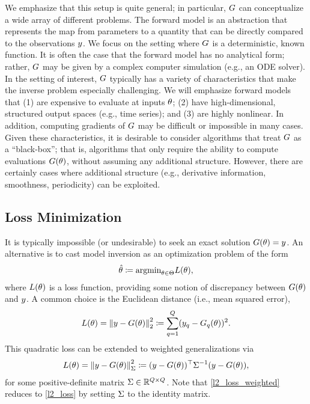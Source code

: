 \documentclass[12pt]{article}
\begin{document}
We emphasize that this setup is quite general; in particular, $G$ can conceptualize a wide array 
of different problems. The forward model is an abstraction that represents the map from parameters to a quantity that
can be directly compared to the observations $y$. We focus on the setting where $G$ is a deterministic, known 
function. It is often the case that the forward model has no analytical form; rather, $G$ may be given by a complex 
computer simulation (e.g., an ODE solver). 
In the setting of interest, $G$ typically has a variety of characteristics that make 
the inverse problem especially challenging. We will emphasize forward models that (1) are expensive to evaluate 
at inputs $\theta$; (2) have high-dimensional, structured output spaces (e.g., time series); and (3) are highly nonlinear. 
In addition, computing gradients of $G$ may be difficult or impossible in many cases. Given these characteristics, 
it is desirable to consider algorithms that treat $G$ as a ``black-box''; that is, algorithms that only require the 
ability to compute evaluations $G(\theta)$, without assuming any additional structure. However, there are certainly 
cases where additional structure (e.g., derivative information, smoothness, periodicity) can be exploited. 

\subsection{Loss Minimization}
It is typically impossible (or undesirable) to seek an exact solution $G(\theta) = y$. An alternative is to cast 
model inversion as an optimization problem of the form 
\begin{align}
\hat{\theta} \coloneqq \text{argmin}_{\theta \in \Theta} L(\theta), \label{opt}
\end{align}
where $L(\theta)$ is a loss function, providing some notion of discrepancy between $G(\theta)$ and $y$.
A common choice is the Euclidean distance (i.e., mean squared error),
\begin{align}
L(\theta) = \left\lVert y - G(\theta)\right\rVert^2_2 \coloneqq \sum_{q=1}^{Q} (y_{q} - G_{q}(\theta))^2. \label{l2_loss}
\end{align}
This quadratic loss can be extended to weighted generalizations via 
\begin{align}
L(\theta) = \left\lVert y - G(\theta)\right\rVert^2_{\Sigma} \coloneqq (y - G(\theta))^\top \Sigma^{-1} (y - G(\theta)), \label{l2_loss_weighted}
\end{align}
for some positive-definite matrix $\Sigma \in \mathbb{R}^{Q \times Q}$. Note that \ref{l2_loss_weighted} reduces to 
\ref{l2_loss} by setting $\Sigma$ to the identity matrix. 
\end{document}
